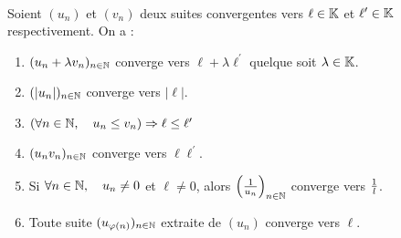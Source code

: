     \begin{theorem}
        \ \\
        \label{theorem:ops_suites_convergentes}
        Soient \((u_n)\) et \((v_n)\) deux suites convergentes vers \(\ell\in\mathbb{K}\) et \(\ell^{\prime}\in\mathbb{K}\) respectivement. On a :
        \begin{enumerate}[label=(\roman*)]
            \item \((u_n + \lambda v_n)_{n\in\mathbb{N}}\) converge vers \(\ell + \lambda \ell^{\prime}\) quelque soit \(\lambda\in\mathbb{K}\). 
            \item \((|u_n|)_{n\in\mathbb{N}}\) converge vers \(|\ell|\).
            \item \((\forall n \in \mathbb{N}, \quad u_n \le v_n) \Rightarrow \ell \le \ell^{\prime}\)
            \item \((u_nv_n)_{n\in\mathbb{N}}\) converge vers \(\ell\ell^{\prime}\).
            \item Si \(\forall n \in \mathbb{N}, \quad u_n \neq 0\) et \(\ell\neq 0\), alors \({\left({1\over u_n}\right)}_{n\in\mathbb{N}}\) converge vers \({1\over l}\).
            \item Toute suite \((u_{\varphi(n)})_{n\in\mathbb{N}}\) extraite de \((u_n)\) converge vers \(\ell\). 
        \end{enumerate}
    \end{theorem}


